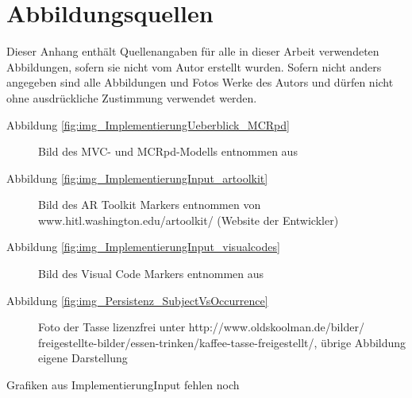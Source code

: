 \chapter*{Abbildungsquellen}

Dieser Anhang enthält Quellenangaben für alle in dieser Arbeit verwendeten Abbildungen, sofern sie nicht vom Autor erstellt wurden. Sofern nicht anders angegeben sind alle Abbildungen und Fotos Werke des Autors und dürfen nicht ohne ausdrückliche Zustimmung verwendet werden.

\begin{description}
 \item[Abbildung \ref{fig:img_ImplementierungUeberblick_MCRpd}] Bild des MVC- und MCRpd-Modells entnommen aus \citep{Ullmer00}
 \end{description}

\begin{description}
 \item[Abbildung \ref{fig:img_ImplementierungInput_artoolkit}] Bild des AR Toolkit Markers entnommen von www.hitl.washington.edu/artoolkit/ (Website der Entwickler)
 \end{description}

\begin{description}
 \item[Abbildung \ref{fig:img_ImplementierungInput_visualcodes}] Bild des Visual Code Markers entnommen aus \citep{Rohs04}
 \end{description}

\begin{description}
 \item[Abbildung \ref{fig:img_Persistenz_SubjectVsOccurrence}] Foto der Tasse lizenzfrei unter http://www.oldskoolman.de/bilder/\\freigestellte-bilder/essen-trinken/kaffee-tasse-freigestellt/, übrige Abbildung eigene Darstellung
 \end{description}

Grafiken aus ImplementierungInput fehlen noch
